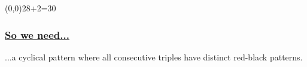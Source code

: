 \begin{frame}\begin{textblock}{1}(0,0)28+2=30\end{textblock}\frametitle{{\color{red}\underline{\Large\bf
}}}\frametitle{\underline{\Large\bf
So we need...}}
...a cyclical pattern where all consecutive triples have distinct
red-black patterns.
%
\end{frame}
